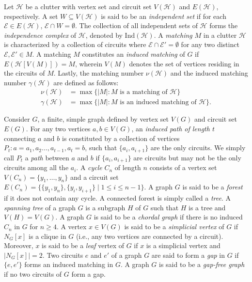 \documentclass[12pt,reqno]{amsart}
\theoremstyle{definition}
\def\H{\mathcal{H}}
\def\E{\mathcal{E}}
\begin{document}
Let $\H$ be a clutter with vertex set and circuit set $V(\H)$ and $E(\H)$, respectively. A set $W\subseteq V(\H)$ is said to be an {\it independent set} if for each $\E\in E(\H)$, $\E\cap W=\emptyset$. The collection of all independent sets of $\H$ forms the {\it independence complex} of $\H$, denoted by $\mathrm{Ind}(\H)$.
A {\it matching} $M$ in a clutter $\H$ is characterized by a collection of circuits where $\E\cap \E'=\emptyset$ for any two distinct $\E,\E'\in M$. 
A matching $M$ constitutes an {\it induced matching} of $G$ if $E(\H[V(M)])=M$, wherein $V(M)$ denotes the set of vertices residing in the circuits of $M$. 
Lastly, the matching number $\nu(\H)$ and the induced matching number $\gamma(\H)$ are defined as follows:
\begin{align*}
		\nu(\H)&=\max\{|M|: M\text{ is a matching of }\H\}\\
		\gamma(\H)&=\max\{|M|: M\text{ is an induced matching of }\H\}.	
\end{align*}
	
	
	
Consider $G$, a finite, simple graph defined by vertex set $V(G)$ and circuit set $E(G)$. For any two vertices $a,b\in V(G)$, an {\it induced path of length $t$} connecting $a$ and $b$ is constituted by a collection of vertices $P_t:a=a_1,a_2\ldots,a_{t-1},a_t=b$, such that $\{a_i,a_{i+1}\}$ are the only circuits. 
We simply call \(P_t\) a \emph{path} between \(a\) and \(b\) if $\{a_i,a_{i+1}\}$ are circuits but may not be the only circuits among all the $a_i$.
A {\it cycle} $C_n$ of length $n$ consists of a vertex set $V(C_n)=\{y_1,\ldots,y_n\}$ and a circuit set $E(C_n)=\{\{y_1,y_n\},\{y_i,y_{i+1}\}\mid 1\le i\le n-1\}$. 
A graph $G$ is said to be a \textit{forest} if it does not contain any cycle. 
A connected forest is simply called a \textit{tree}. A {\it spanning tree} of a graph $G$ is a subgraph $H$ of $G$ such that $H$ is a tree and $V(H)=V(G)$. 
A graph $G$ is said to be a \textit{chordal graph} if there is no induced $C_n$ in $G$ for $n\geq 4$. 
A vertex $x\in V(G)$ is said to be a \textit{simplicial vertex} of $G$ if $N_{G}[x]$ is a clique in $G$ (i.e., any two vertices are connected by a circuit). 
Moreover, $x$ is said to be a {\it leaf} vertex of $G$ if $x$ is a simplicial vertex and $|N_G[x]|=2$. 
Two circuits $e$ and $e'$ of a graph $G$ are said to form a \textit{gap} in $G$ if $\{e,e'\}$ forms an induced matching in $G$. A graph $G$ is said to be a {\it gap-free graph} if no two circuits of $G$ form a gap.
	
\end{document}
